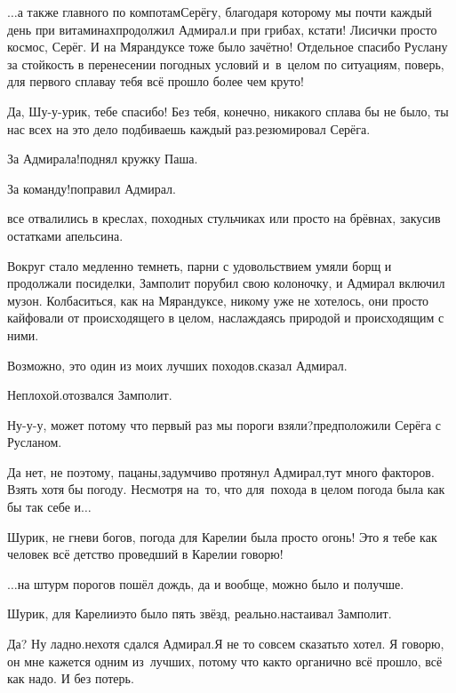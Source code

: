\diagdash $\ldots$а также главного по компотам\mdash Серёгу, благодаря которому мы почти каждый день при витаминах\mdash продолжил Адмирал.\mdash и при грибах, кстати! Лисички просто космос, Серёг. И на Мярандуксе тоже было зачётно! Отдельное спасибо Руслану за стойкость в перенесении погодных условий и~в~целом по ситуациям, поверь, для первого сплава\mdash у тебя всё прошло более чем круто! 

\diagdash Да, Шу-у-урик, тебе спасибо! Без тебя, конечно, никакого сплава бы не было, ты нас всех на это дело подбиваешь каждый раз.\mdash резюмировал Серёга.

\diagdash За Адмирала!\mdash поднял кружку Паша.

\diagdash За команду!\mdash поправил Адмирал.

\mdash все отвалились в креслах, походных стульчиках или просто на брёвнах, закусив остатками апельсина.

Вокруг стало медленно темнеть, парни с удовольствием умяли борщ и продолжали посиделки, Замполит порубил свою колоночку, и Адмирал включил музон. Колбаситься, как на Мярандуксе, никому уже не хотелось, они просто кайфовали от происходящего в целом, наслаждаясь природой и происходящим с ними.

\diagdash Возможно, это один из моих лучших походов.\mdash сказал Адмирал.

\diagdash Неплохой.\mdash отозвался Замполит.

\diagdash Ну-у-у, может потому что первый раз мы пороги взяли?\mdash предположили Серёга с Русланом.

\diagdash Да нет, не поэтому, пацаны,\mdash задумчиво протянул Адмирал,\mdash тут много факторов. Взять хотя бы погоду. Несмотря на~то, что для~похода в целом погода была как бы так себе и$\ldots$

\diagdash Шурик, не гневи богов, погода для Карелии была просто огонь! Это я тебе как человек всё детство проведший в Карелии говорю!

\diagdash $\ldots$на штурм порогов пошёл дождь, да и вообще, можно было и получше.

\diagdash Шурик, для Карелии\mdash это было пять звёзд, реально.\mdash настаивал Замполит.

\diagdash Да? Ну ладно.\mdash нехотя сдался Адмирал.\mdash Я не то совсем сказать\sdash то хотел. Я говорю, он мне кажется одним из~лучших, потому что как\sdash то органично всё прошло, всё как надо. И без потерь.

